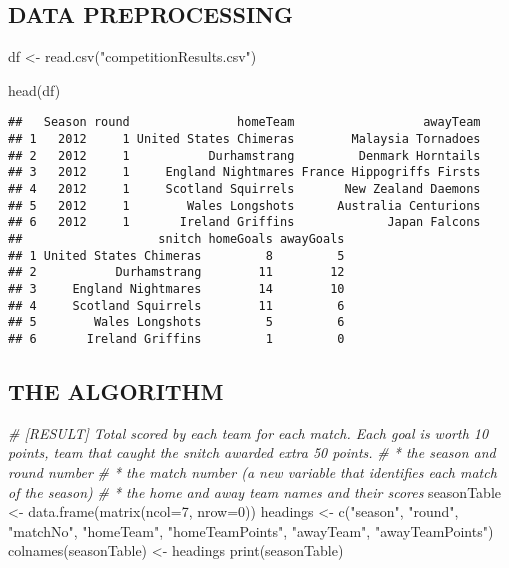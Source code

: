 \documentclass[
]{article}
\newenvironment{Shaded}{\begin{snugshade}}{\end{snugshade}}
\newcommand{\AttributeTok}[1]{\textcolor[rgb]{0.77,0.63,0.00}{#1}}
\newcommand{\CommentTok}[1]{\textcolor[rgb]{0.56,0.35,0.01}{\textit{#1}}}
\newcommand{\DecValTok}[1]{\textcolor[rgb]{0.00,0.00,0.81}{#1}}
\newcommand{\FunctionTok}[1]{\textcolor[rgb]{0.00,0.00,0.00}{#1}}
\newcommand{\NormalTok}[1]{#1}
\newcommand{\OtherTok}[1]{\textcolor[rgb]{0.56,0.35,0.01}{#1}}
\newcommand{\StringTok}[1]{\textcolor[rgb]{0.31,0.60,0.02}{#1}}
\begin{document}
\hypertarget{data-preprocessing}{%
\subsection{DATA PREPROCESSING}\label{data-preprocessing}}

\begin{Shaded}
\begin{Highlighting}[]
\NormalTok{df }\OtherTok{\textless{}{-}} \FunctionTok{read.csv}\NormalTok{(}\StringTok{"competitionResults.csv"}\NormalTok{)}

\FunctionTok{head}\NormalTok{(df)}
\end{Highlighting}
\end{Shaded}

\begin{verbatim}
##   Season round               homeTeam                  awayTeam
## 1   2012     1 United States Chimeras        Malaysia Tornadoes
## 2   2012     1           Durhamstrang         Denmark Horntails
## 3   2012     1     England Nightmares France Hippogriffs Firsts
## 4   2012     1     Scotland Squirrels       New Zealand Daemons
## 5   2012     1        Wales Longshots      Australia Centurions
## 6   2012     1       Ireland Griffins             Japan Falcons
##                   snitch homeGoals awayGoals
## 1 United States Chimeras         8         5
## 2           Durhamstrang        11        12
## 3     England Nightmares        14        10
## 4     Scotland Squirrels        11         6
## 5        Wales Longshots         5         6
## 6       Ireland Griffins         1         0
\end{verbatim}

\hypertarget{the-algorithm}{%
\subsection{THE ALGORITHM}\label{the-algorithm}}

\begin{Shaded}
\begin{Highlighting}[]
\CommentTok{\# [RESULT] Total scored by each team for each match. Each goal is worth 10 points, team that caught the snitch  awarded extra 50 points. }
\CommentTok{\# * the season and round number}
\CommentTok{\# * the match number (a new variable that identifies each match of the season)}
\CommentTok{\# * the home and away team names and their scores}
\NormalTok{seasonTable }\OtherTok{\textless{}{-}} \FunctionTok{data.frame}\NormalTok{(}\FunctionTok{matrix}\NormalTok{(}\AttributeTok{ncol=}\DecValTok{7}\NormalTok{, }\AttributeTok{nrow=}\DecValTok{0}\NormalTok{))}
\NormalTok{headings }\OtherTok{\textless{}{-}} \FunctionTok{c}\NormalTok{(}\StringTok{"season"}\NormalTok{, }\StringTok{"round"}\NormalTok{, }\StringTok{"matchNo"}\NormalTok{, }\StringTok{"homeTeam"}\NormalTok{, }\StringTok{"homeTeamPoints"}\NormalTok{, }\StringTok{"awayTeam"}\NormalTok{, }\StringTok{"awayTeamPoints"}\NormalTok{)}
\FunctionTok{colnames}\NormalTok{(seasonTable) }\OtherTok{\textless{}{-}}\NormalTok{ headings}
\FunctionTok{print}\NormalTok{(seasonTable)}
\end{Highlighting}
\end{Shaded}
\end{document}
